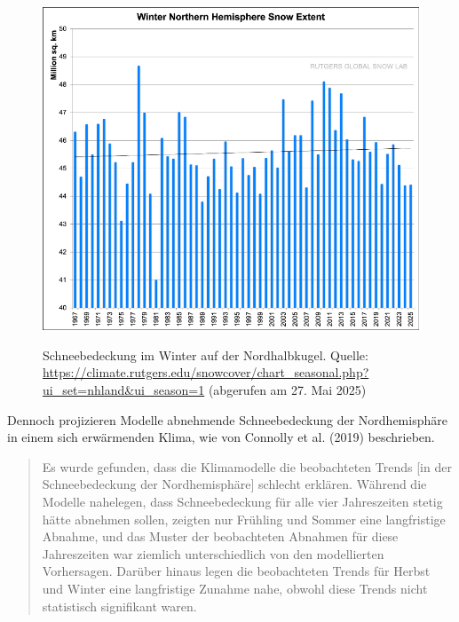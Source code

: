 \documentclass[12pt,paper=a4,DIV=12,parskip=never,chapterprefix=false,headings=standardclasses]{scrreprt}
\begin{document}
\begin{figure}[H]
\begin{center}
\includegraphics[width=1.0\textwidth]{bilder/bilderKlima-0031.png}\\[1cm]
\end{center}
\caption{Schneebedeckung im Winter auf der Nordhalbkugel.
Quelle: \url{https://climate.rutgers.edu/snowcover/chart_seasonal.php?ui_set=nhland&ui_season=1}
(abgerufen am 27. Mai 2025)}
\end{figure}

Dennoch projizieren Modelle abnehmende Schneebedeckung der Nordhemisphäre in einem sich erwärmenden Klima, wie von Connolly et al. (2019) beschrieben.
\begin{quote}
Es wurde gefunden, dass die Klimamodelle die beobachteten Trends [in der Schneebedeckung der Nordhemisphäre] schlecht erklären. Während die Modelle nahelegen, dass Schneebedeckung für alle vier Jahreszeiten stetig hätte abnehmen sollen, zeigten nur Frühling und Sommer eine langfristige Abnahme, und das Muster der beobachteten Abnahmen für diese Jahreszeiten war ziemlich unterschiedlich von den modellierten Vorhersagen. Darüber hinaus legen die beobachteten Trends für Herbst und Winter eine langfristige Zunahme nahe, obwohl diese Trends nicht statistisch signifikant waren.
\end{quote}
\end{document}
